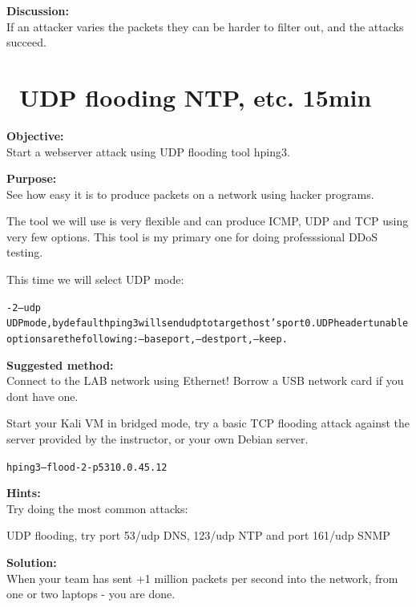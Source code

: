 \documentclass[a4paper,11pt,notitlepage]{report}
\begin{document}
{\bf Discussion:}\\
If an attacker varies the packets they can be harder to filter out, and the attacks succeed.

\chapter{\faInfoCircle\ UDP flooding NTP, etc. 15min}


{\bf Objective:}\\
Start a webserver attack using UDP flooding tool hping3.

{\bf Purpose:}\\
See how easy it is to produce packets on a network using hacker programs.

The tool we will use is very flexible and can produce ICMP, UDP and TCP using very few options. This tool is my primary one for doing professsional DDoS testing.

This time we will select UDP mode:

\begin{alltt}\footnotesize
-2 --udp
       UDP mode, by default hping3 will send udp to target host's port 0.  UDP header  tunable
       options are the following: --baseport, --destport, --keep.
\end{alltt}

{\bf Suggested method:}\\
Connect to the LAB network using Ethernet! Borrow a USB network card if you dont have one.

Start your Kali VM in bridged mode, try a basic TCP flooding attack against the server provided by the instructor, or your own Debian server.

\begin{alltt}\footnotesize
hping3 --flood -2 -p 53 10.0.45.12
\end{alltt}



{\bf Hints:}\\

Try doing the most common attacks:
\begin{list2}
\item UDP flooding, try port 53/udp DNS, 123/udp NTP and port 161/udp SNMP
\end{list2}

{\bf Solution:}\\
When your team has sent +1 million packets per second into the network, from one or two laptops - you are done.
\end{document}
